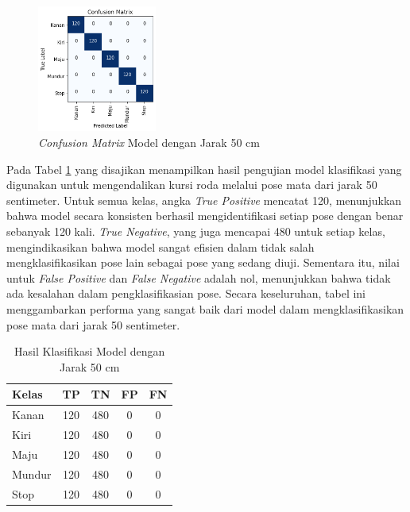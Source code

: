 \begin{figure} [H] \centering
  \includegraphics[width=0.35\textwidth]{gambar/bab4/model6 (50cm)/matrix.png}
  \caption{\emph{Confusion Matrix} Model dengan Jarak 50 cm}
  \label{fig:matrix3}
\end{figure}

Pada Tabel \ref{tb:cm_model3} yang disajikan menampilkan hasil pengujian model klasifikasi yang digunakan untuk mengendalikan kursi roda melalui pose mata dari jarak 50 sentimeter. Untuk semua kelas, angka \emph{True Positive} mencatat 120, menunjukkan bahwa model secara konsisten berhasil mengidentifikasi setiap pose dengan benar sebanyak 120 kali. \emph{True Negative}, yang juga mencapai 480 untuk setiap kelas, mengindikasikan bahwa model sangat efisien dalam tidak salah mengklasifikasikan pose lain sebagai pose yang sedang diuji. Sementara itu, nilai untuk \emph{False Positive} dan \emph{False Negative} adalah nol, menunjukkan bahwa tidak ada kesalahan dalam pengklasifikasian pose. Secara keseluruhan, tabel ini menggambarkan performa yang sangat baik dari model dalam mengklasifikasikan pose mata dari jarak 50 sentimeter.

\begin{longtable}{|l|c|c|c|c|}
  \caption{Hasil Klasifikasi Model dengan Jarak 50 cm}
  \label{tb:cm_model3} \\
  \hline
  \rowcolor[HTML]{C0C0C0} 
  \textbf{Kelas} & \textbf{TP} & \textbf{TN} & \textbf{FP} & \textbf{FN} \\ \hline
  Kanan    & 120          & 480         & 0           & 0           \\ \hline
  Kiri      & 120          & 480         & 0           & 0           \\ \hline
  Maju      & 120          & 480         & 0           & 0           \\ \hline
  Mundur     & 120          & 480         & 0           & 0           \\ \hline
  Stop  & 120          & 480         & 0           & 0           \\ \hline
\end{longtable}

